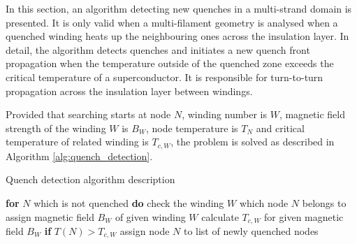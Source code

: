 
In this section, an algorithm detecting new quenches in a multi-strand domain is presented. It is only valid when a multi-filament geometry is analysed when a quenched winding heats up the neighbouring ones across the insulation layer. In detail, the algorithm detects quenches and initiates a new quench front propagation  when the temperature outside of the quenched zone exceeds the critical temperature of a superconductor. It is responsible for turn-to-turn propagation across the insulation layer between windings.

Provided that searching starts at node $N$, winding number is $W$, magnetic field strength of the winding $W$ is $B_W$, node temperature is $T_N$ and critical temperature of related winding is $T_{c,W}$, the problem is solved as described in Algorithm \ref{alg:quench_detection}.

\begin{algorithm}
    \caption{Quench detection algorithm description}
    \label{alg:quench_detection}
    \begin{algorithmic}[1]
    \STATE \textbf{for} $N$ which is not quenched \textbf{do}
    \STATE \hspace{0.5cm} check the winding $W$ which node $N$ belongs to
    \STATE \hspace{0.5cm} assign magnetic field $B_W$ of given winding $W$
    \STATE \hspace{0.5cm} calculate $T_{c,W}$ for given magnetic field $B_W$
    \STATE \hspace{0.5cm} \textbf{if} $T(N) > T_{c,W}$
    \STATE \hspace{1.0cm} assign node $N$ to list of newly quenched nodes
    \end{algorithmic}
\end{algorithm}